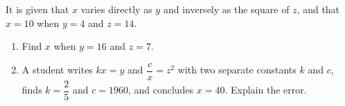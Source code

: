 It is given that $x$ varies directly as $y$ and inversely as the square of $z$, and that $x=10$ when $y=4$ and $z=14$.
\begin{enumerate}
\item[(a)] Find $x$ when $y=16$ and $z=7$.
\item[(b)] A student writes $kx=y$ and $\dfrac {c}{x}=z^2$ with two separate constants $k$ and $c$, finds $k=\dfrac{2}{5}$ and $c=1960$, and concludes $x=40$. Explain the error.
\end{enumerate}
